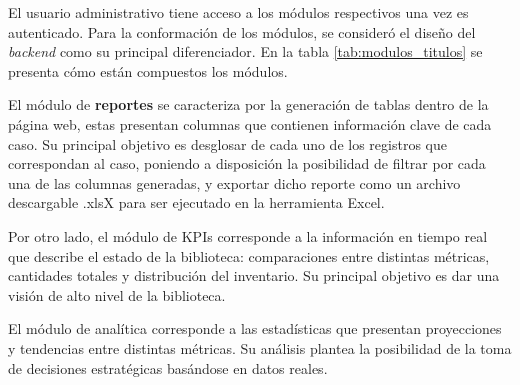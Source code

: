 \documentclass[spanish]{ieee_upb}
\begin{document}
El usuario administrativo tiene acceso a los módulos respectivos una vez es autenticado. Para la conformación de los módulos, se consideró el diseño del \textit{backend} como su principal diferenciador. En la tabla \ref{tab:modulos_titulos} se presenta cómo están compuestos los módulos.

\vspace{0.3cm}
El módulo de \textbf{reportes}  se caracteriza por la generación de tablas dentro de la página web, estas presentan columnas que contienen información clave de cada caso. Su principal objetivo es desglosar de cada uno de los registros que correspondan al caso, poniendo a disposición la posibilidad de filtrar por cada una de las columnas generadas, y exportar dicho reporte como un archivo descargable .xlsX para ser ejecutado en la herramienta Excel. 

\vspace{0.3cm}
Por otro lado, el módulo de KPIs corresponde a la información en tiempo real que describe el estado de la biblioteca: comparaciones entre distintas métricas, cantidades totales y distribución del inventario. Su principal objetivo es dar una visión de alto nivel de la biblioteca.

\vspace{0.3cm}
El módulo de analítica corresponde a las estadísticas que presentan proyecciones y tendencias entre distintas métricas. Su análisis plantea la posibilidad de la toma de decisiones estratégicas basándose en datos reales. 
\end{document}
